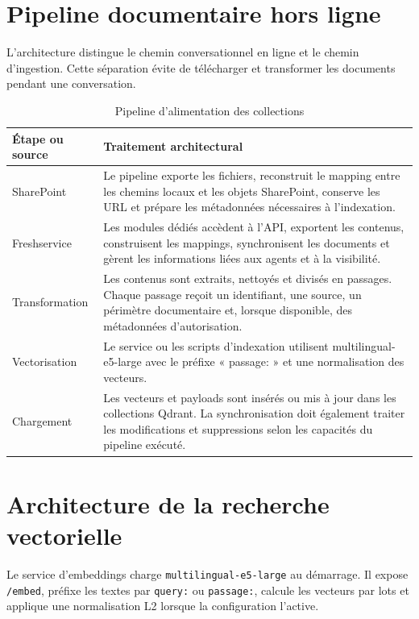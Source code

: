 
\section{Pipeline documentaire hors ligne}

L'architecture distingue le chemin conversationnel en ligne et le chemin d'ingestion. Cette séparation évite de télécharger et transformer les documents pendant une conversation.

\begin{table}[H]
\centering
\caption{Pipeline d'alimentation des collections}
\label{tab:ingestion_ch5}
\begin{tabular}{p{3.2cm}p{10.0cm}}
\toprule
\textbf{Étape ou source} & \textbf{Traitement architectural} \\
\midrule
SharePoint & Le pipeline exporte les fichiers, reconstruit le mapping entre les chemins locaux et les objets SharePoint, conserve les URL et prépare les métadonnées nécessaires à l’indexation. \\
Freshservice & Les modules dédiés accèdent à l’API, exportent les contenus, construisent les mappings, synchronisent les documents et gèrent les informations liées aux agents et à la visibilité. \\
Transformation & Les contenus sont extraits, nettoyés et divisés en passages. Chaque passage reçoit un identifiant, une source, un périmètre documentaire et, lorsque disponible, des métadonnées d’autorisation. \\
Vectorisation & Le service ou les scripts d’indexation utilisent multilingual-e5-large avec le préfixe « passage: » et une normalisation des vecteurs. \\
Chargement & Les vecteurs et payloads sont insérés ou mis à jour dans les collections Qdrant. La synchronisation doit également traiter les modifications et suppressions selon les capacités du pipeline exécuté. \\
\bottomrule
\end{tabular}
\end{table}

\section{Architecture de la recherche vectorielle}

Le service d'embeddings charge \texttt{multilingual-e5-large} au démarrage. Il expose \texttt{/embed}, préfixe les textes par \texttt{query:} ou \texttt{passage:}, calcule les vecteurs par lots et applique une normalisation L2 lorsque la configuration l'active.


